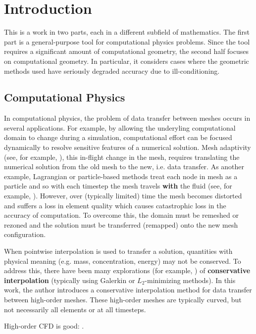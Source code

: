 \chapter{Introduction}

This is a work in two parts, each in a different subfield of mathematics.
The first part is a general-purpose tool for computational physics problems.
Since the tool requires a significant amount of computational geometry, the
second half focuses on computational geometry. In particular, it considers
cases where the geometric methods used have seriously degraded accuracy due to
ill-conditioning.

\section{Computational Physics}

In computational physics, the problem of data transfer between meshes
occurs in several applications. For example, by allowing the underyling
computational domain to change during a simulation, computational
effort can be focused dynamically to resolve sensitive features
of a numerical solution. Mesh adaptivity (see, for example,
\cite{Dukowicz1987, Babuska1978}), this in-flight change in the mesh,
requires translating the numerical solution from the old mesh to the new,
i.e. data transfer. As another example, Lagrangian or particle-based methods
treat each node in mesh as a particle and so with each timestep the mesh
travels \textbf{with} the fluid (see, for example, \cite{Hirt1974}).
However, over (typically limited) time the mesh
becomes distorted and suffers a loss in element quality which causes
catastrophic loss in the accuracy of computation. To overcome this, the
domain must be remeshed or rezoned and the solution must be
transferred (remapped) onto the new mesh configuration.

When pointwise interpolation is used to transfer a solution, quantities with
physical meaning (e.g. mass, concentration, energy) may not be conserved.
To address this, there have been many explorations (for example,
\cite{Jiao2004, Farrell2009, Farrell2011}) of
\textbf{conservative interpolation} (typically using Galerkin or
\(L_2\)-minimizing methods). In this work, the author introduces a
conservative interpolation method for data transfer between high-order
meshes. These high-order meshes are typically curved, but not necessarily
all elements or at all timesteps.

High-order CFD is good: \cite{Wang2013}.

